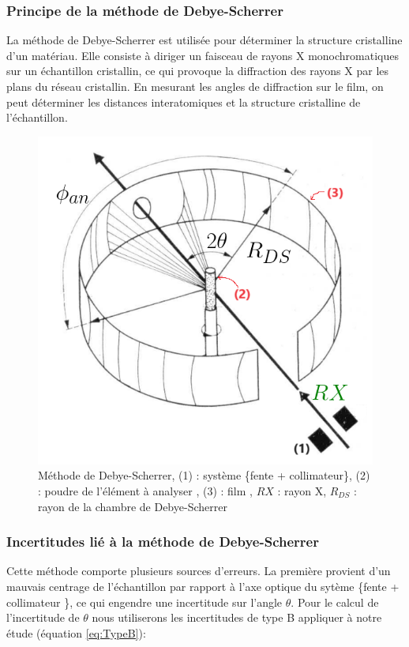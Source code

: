 \subsubsection{Principe de la méthode de Debye-Scherrer}

La méthode de Debye-Scherrer est utilisée pour déterminer la structure cristalline d'un matériau. Elle consiste à diriger un faisceau de rayons X monochromatiques sur un échantillon cristallin, ce qui provoque la diffraction des rayons X par les plans du réseau cristallin. En mesurant les angles de diffraction sur le film, on peut déterminer les distances interatomiques et la structure cristalline de l'échantillon.
\begin{figure}[h!]
	\centering
	\includegraphics[width=0.7\linewidth]{Méthode_de_Debye_Scherrer/Méthode_de_Debye_Scherrer}
	\caption{\centering Méthode de Debye-Scherrer, (1) : système \{fente + collimateur\}, (2) : poudre de l'élément à analyser , (3) : film , $RX$ : rayon X, $R_{DS}$ : rayon de la chambre de Debye-Scherrer}
	\label{fig:methodededebyescherrer}
\end{figure}
\newpage



\subsubsection{Incertitudes lié à la méthode de Debye-Scherrer}

Cette méthode comporte plusieurs sources d'erreurs. La première provient d'un mauvais centrage de l'échantillon par rapport à l'axe optique du sytème \{fente + collimateur \}, ce qui engendre une incertitude sur l'angle $\theta$.
Pour le calcul de l'incertitude de $\theta$ nous utiliserons les incertitudes de type B appliquer à notre étude (équation \ref{eq:TypeB}):

